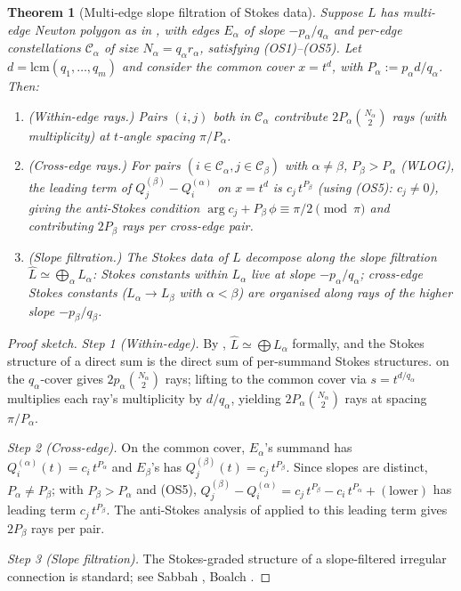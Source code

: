 \documentclass[aip,jmp,preprint,amsmath,amssymb,nofootinbib,floatfix]{revtex4-2}
\theoremstyle{plain}
\newtheorem{theorem}{Theorem}[section]
\theoremstyle{definition}
\theoremstyle{remark}
\newcommand{\Cl}{\mathcal{C}}
\DeclareMathOperator{\arginline}{arg}
\begin{document}
\begin{theorem}[Multi-edge slope filtration of Stokes data]\label{thm:AT5}
Suppose $L$ has multi-edge Newton polygon as in , with edges
$E_\alpha$ of slope $-p_\alpha / q_\alpha$ and per-edge constellations
$\Cl_\alpha$ of size $N_\alpha = q_\alpha r_\alpha$, satisfying (OS1)--(OS5).
Let $d = \mathrm{lcm}(q_1, \dots, q_m)$ and consider the common cover
$x = t^d$, with $P_\alpha := p_\alpha d / q_\alpha$. Then:
\begin{enumerate}[leftmargin=2em]
\item (Within-edge rays.) Pairs $(i, j)$ both in $\Cl_\alpha$ contribute
      $2 P_\alpha \binom{N_\alpha}{2}$ rays (with multiplicity) at
      $t$-angle spacing $\pi / P_\alpha$.
\item (Cross-edge rays.) For pairs $(i \in \Cl_\alpha, j \in \Cl_\beta)$
      with $\alpha \ne \beta$, $P_\beta > P_\alpha$ (WLOG), the leading
      term of $Q_j^{(\beta)} - Q_i^{(\alpha)}$ on $x = t^d$ is $c_j\,
      t^{P_\beta}$ (using (OS5): $c_j \ne 0$), giving the anti-Stokes
      condition $\arginline c_j + P_\beta\, \phi \equiv \pi/2 \pmod{\pi}$
      and contributing $2 P_\beta$ rays per cross-edge pair.
\item (Slope filtration.) The Stokes data of $L$ decompose along the
      slope filtration $\widehat{L} \simeq \bigoplus_\alpha L_\alpha$:
      Stokes constants within $L_\alpha$ live at slope $-p_\alpha /
      q_\alpha$; cross-edge Stokes constants ($L_\alpha \to L_\beta$ with
      $\alpha < \beta$) are organised along rays of the \emph{higher}
      slope $-p_\beta / q_\beta$.
\end{enumerate}
\end{theorem}

\begin{proof}[Proof sketch]
\textit{Step 1 (Within-edge).} By , $\widehat{L} \simeq
\bigoplus L_\alpha$ formally, and the Stokes structure of a direct sum is
the direct sum of per-summand Stokes structures.  on the
$q_\alpha$-cover gives $2 p_\alpha \binom{N_\alpha}{2}$ rays; lifting to
the common cover via $s = t^{d/q_\alpha}$ multiplies each ray's
multiplicity by $d / q_\alpha$, yielding $2 P_\alpha \binom{N_\alpha}{2}$
rays at spacing $\pi / P_\alpha$.

\textit{Step 2 (Cross-edge).} On the common cover, $E_\alpha$'s summand
has $Q_i^{(\alpha)}(t) = c_i\, t^{P_\alpha}$ and $E_\beta$'s has
$Q_j^{(\beta)}(t) = c_j\, t^{P_\beta}$. Since slopes are distinct,
$P_\alpha \ne P_\beta$; with $P_\beta > P_\alpha$ and (OS5),
$Q_j^{(\beta)} - Q_i^{(\alpha)} = c_j\, t^{P_\beta} - c_i\, t^{P_\alpha}
+ (\text{lower})$ has leading term $c_j\, t^{P_\beta}$. The anti-Stokes
analysis of  applied to this leading term gives $2 P_\beta$
rays per pair.

\textit{Step 3 (Slope filtration).} The Stokes-graded structure of a
slope-filtered irregular connection is standard; see Sabbah
\cite[\S 11]{sabbah-polarizable}, Boalch \cite[\S 3]{boalch-wildhodge}.
\end{proof}
\end{document}
